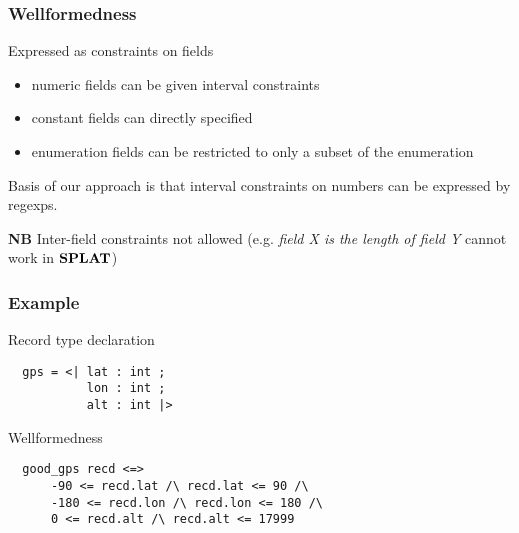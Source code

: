 \documentclass{beamer}
\newcommand{\konst}[1]{\ensuremath{\mbox{\bf{#1}}}}
\begin{document}
\begin{frame}\frametitle{Wellformedness}

Expressed as constraints on fields

\vspace*{5mm}

\begin{itemize}
 \item numeric fields can be given interval constraints
 \item constant fields can directly specified
 \item enumeration fields can be restricted to only a subset of the enumeration
\end{itemize}

\vspace*{5mm}

Basis of our approach is that interval constraints on numbers can be expressed by regexps.

\vspace*{5mm}
\noindent\textbf{NB}
Inter-field constraints not allowed (e.g. \textit{field X is the
  length of field Y} cannot work in \konst{SPLAT})

\end{frame}


\begin{frame}[fragile]\frametitle{Example}

Record type declaration

\begin{verbatim}
  gps = <| lat : int ;
           lon : int ;
           alt : int |>
\end{verbatim}

Wellformedness

\begin{verbatim}
  good_gps recd <=>
      -90 <= recd.lat /\ recd.lat <= 90 /\
      -180 <= recd.lon /\ recd.lon <= 180 /\
      0 <= recd.alt /\ recd.alt <= 17999
\end{verbatim}

\end{frame}
\end{document}
